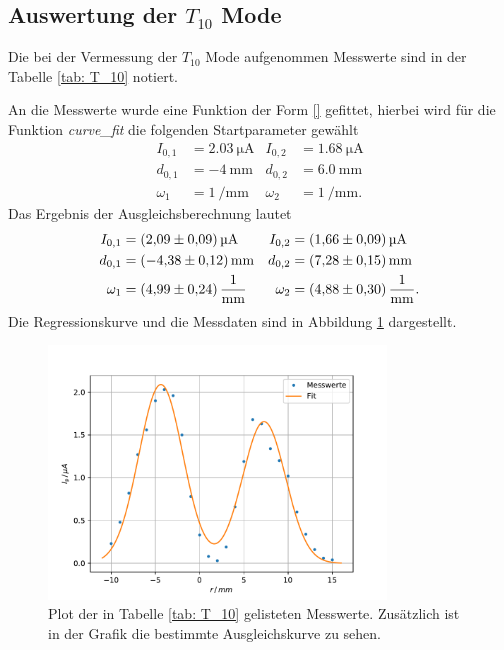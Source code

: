 \subsection{Auswertung der $T_{10}$ Mode}
\FloatBarrier
Die bei der Vermessung der $T_{10}$ Mode aufgenommen Messwerte sind in der Tabelle
\ref{tab: T_10} notiert.

An die Messwerte wurde eine Funktion der Form \eqref{} gefittet, hierbei wird für
die Funktion \emph{curve\_fit} die folgenden Startparameter gewählt
\begin{align*}
  I_{0,1}&=\SI{2.03}{\micro\ampere} & I_{0,2}&=\SI{1.68}{\micro\ampere}\\
  d_{0,1}&=\SI{-4}{\milli\meter}& d_{0,2}&=\SI{6.0}{\milli\meter} \\
  \omega_1&=\SI{1}{\per\milli\meter} &   \omega_2&=\SI{1}{\per\milli\meter}.
\end{align*}
Das Ergebnis der Ausgleichsberechnung lautet
\begin{align}
  \label{eq: fit_t_10}
  \begin{aligned}
  I_{0,1}&=\SI{2.09\pm0.09}{\micro\ampere} & I_{0,2}&=\SI{1.66\pm0.09}{\micro\ampere}\\
  d_{0,1}&=\SI{-4.38\pm0.12}{\milli\meter}& d_{0,2}&=\SI{7.28\pm0.15}{\milli\meter} \\
  \omega_1&=\SI{4.99\pm0.24}{\per\milli\meter} &   \omega_2&=\SI{4.88\pm0.30}{\per\milli\meter}.
\end{aligned}
\end{align}
Die Regressionskurve und die Messdaten sind in Abbildung \ref{fig: T_10} dargestellt.
\begin{figure}[h!]
  \centering
  \includegraphics[width=0.8\textwidth]{../Messdaten/plots/T_10.pdf}
  \caption{Plot der in Tabelle \ref{tab: T_10} gelisteten Messwerte. Zusätzlich ist in der Grafik die bestimmte Ausgleichskurve zu sehen.}
  \label{fig: T_10}
\end{figure}
\FloatBarrier
